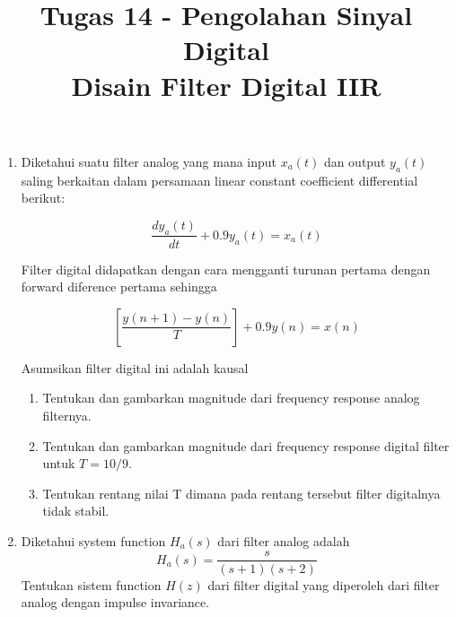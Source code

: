 \documentclass[12pt,a4paper]{article}
\title{Tugas 14 - Pengolahan Sinyal Digital\\
	Disain Filter Digital IIR}
\date{}
\begin{document}
	\maketitle
	\date{}
	\begin{enumerate}
		\item Diketahui suatu filter analog yang mana input $ x_a(t) $ dan output $ y_a(t) $ saling berkaitan dalam persamaan linear constant coefficient differential berikut:
		
		\[ \frac{dy_a(t)}{dt} + 0.9 y_a(t) = x_a(t) \]
		
		Filter digital didapatkan dengan cara mengganti turunan pertama dengan forward diference pertama sehingga
		
		\[ \left[ \frac{y(n+1) - y(n)}{T} \right] + 0.9 y(n) = x(n)  \]
		
		Asumsikan filter digital ini adalah kausal
		\begin{enumerate}
			\item Tentukan dan gambarkan magnitude dari frequency response analog filternya.
			\item Tentukan dan gambarkan magnitude dari frequency response digital filter untuk $ T = 10/9 $.
			\item Tentukan rentang nilai T dimana pada rentang tersebut filter digitalnya tidak stabil.
		\end{enumerate}
		\item Diketahui system function $ H_a (s) $ dari filter analog adalah
		\[ H_a (s) = \frac{s}{(s+1)(s+2)} \]
		Tentukan sistem function $ H(z) $ dari filter digital yang diperoleh dari filter analog dengan impulse invariance.
	\end{enumerate}
\end{document}
